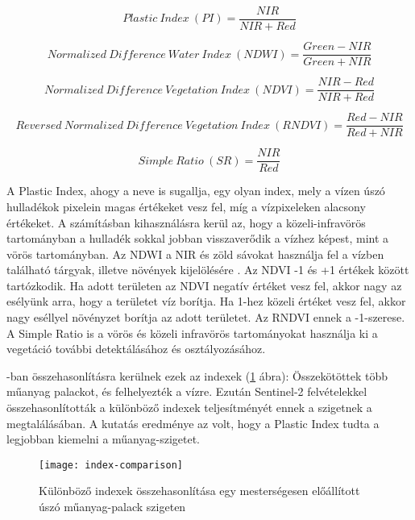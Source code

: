 \begin{equation}\label{eq:pi}
    Plastic \ Index \ (PI) = \frac{NIR}{NIR + Red}
\end{equation}

\begin{equation}\label{eq:ndwi}
    Normalized \ Difference \ Water \ Index \ (NDWI) = \frac{Green - NIR}{Green + NIR}
\end{equation}

\begin{equation}\label{eq:ndvi}
    Normalized \ Difference \ Vegetation \ Index \ (NDVI) = \frac{NIR - Red}{NIR + Red}
\end{equation}

\begin{equation}\label{eq:rndvi}
    Reversed \ Normalized \ Difference \ Vegetation \ Index \ (RNDVI) = \frac{Red - NIR}{Red + NIR}
\end{equation}

\begin{equation}\label{eq:sr}
    Simple \ Ratio \ (SR) = \frac{NIR}{Red}
\end{equation}

A Plastic Index, ahogy a neve is sugallja, egy olyan index, mely a vízen úszó hulladékok pixelein magas értékeket vesz fel, míg a vízpixeleken alacsony értékeket. A számításban kihasználásra kerül az, hogy a közeli-infravörös tartományban a hulladék sokkal jobban visszaverődik a vízhez képest, mint a vörös tartományban. Az NDWI a NIR és zöld sávokat használja fel a vízben található tárgyak, illetve növények kijelölésére \cite{McFeeters1996}. Az NDVI -1 és +1 értékek között tartózkodik. Ha adott területen az NDVI negatív értéket vesz fel, akkor nagy az esélyünk arra, hogy a területet víz borítja. Ha 1-hez közeli értéket vesz fel, akkor nagy eséllyel növényzet borítja az adott területet. Az RNDVI ennek a -1-szerese. A Simple Ratio is a vörös és közeli infravörös tartományokat használja ki a vegetáció további detektálásához és osztályozásához. 

\cite{Themistocleous2020}-ban összehasonlításra kerülnek ezek az indexek (\ref{fig:index-comparison} ábra): Összekötöttek több műanyag palackot, és felhelyezték a vízre. Ezután Sentinel-2 felvételekkel összehasonlították a különböző indexek teljesítményét ennek a szigetnek a megtalálásában. A kutatás eredménye az volt, hogy a Plastic Index tudta a legjobban kiemelni a műanyag-szigetet.

\begin{figure}[H]
	\centering
	\texttt{[image: index-comparison]}
	\caption{Különböző indexek összehasonlítása egy mesterségesen előállított úszó műanyag-palack szigeten \cite{Themistocleous2020}}
    \label{fig:index-comparison}
\end{figure}
